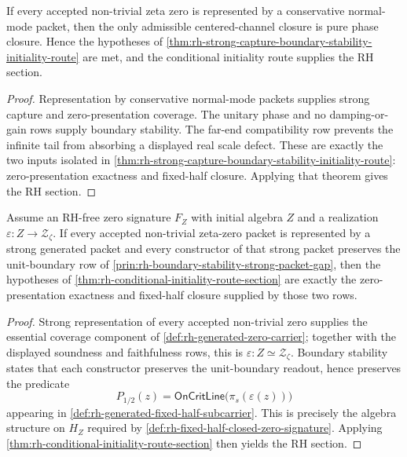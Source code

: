 \begin{corollary}
\label{cor:rh-physical-form-conditional-route}
If every accepted non-trivial zeta zero is represented by a conservative
normal-mode packet, then the only admissible centered-channel closure is
pure phase closure. Hence the hypotheses of
\autoref{thm:rh-strong-capture-boundary-stability-initiality-route} are
met, and the conditional initiality route supplies the RH section.
\end{corollary}

\begin{proof}
Representation by conservative normal-mode packets supplies strong
capture and zero-presentation coverage. The unitary phase and no
damping-or-gain rows supply boundary stability. The far-end compatibility
row prevents the infinite tail from absorbing a displayed real scale
defect. These are exactly the two inputs isolated in
\autoref{thm:rh-strong-capture-boundary-stability-initiality-route}:
zero-presentation exactness and fixed-half closure. Applying that theorem
gives the RH section.
\end{proof}

\begin{theorem}
\label{thm:rh-strong-capture-boundary-stability-initiality-route}
Assume an RH-free zero signature $F_Z$ with initial algebra $Z$ and a
realization $\varepsilon:Z\to\mathcal Z_{\zeta}$. If every accepted
non-trivial zeta-zero packet is represented by a strong generated packet
and every constructor of that strong packet preserves the unit-boundary
row of
\autoref{prin:rh-boundary-stability-strong-packet-gap}, then the
hypotheses of
\autoref{thm:rh-conditional-initiality-route-section} are exactly the
zero-presentation exactness and fixed-half closure supplied by those two
rows.
\end{theorem}

\begin{proof}
Strong representation of every accepted non-trivial zero supplies the
essential coverage component of
\autoref{def:rh-generated-zero-carrier}; together with the displayed
soundness and faithfulness rows, this is
$\varepsilon:Z\simeq\mathcal Z_{\zeta}$. Boundary stability states that
each constructor preserves the unit-boundary readout, hence preserves
the predicate
$$
P_{1/2}(z)=
\mathsf{OnCritLine}\bigl(\pi_s(\varepsilon(z))\bigr)
$$
appearing in \autoref{def:rh-generated-fixed-half-subcarrier}. This is
precisely the algebra structure on $H_Z$ required by
\autoref{def:rh-fixed-half-closed-zero-signature}. Applying
\autoref{thm:rh-conditional-initiality-route-section} then yields the
RH section.
\end{proof}

